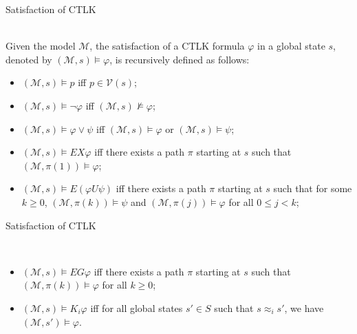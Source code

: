 \documentclass{beamer}
\begin{document}
\begin{frame}{Satisfaction of CTLK}
\begin{definition} ~\\
Given the model $ \mathcal M$, the satisfaction of a CTLK formula
$ \varphi$ in a global state $ s$, denoted by $ (\mathcal M, s )
\models \varphi$, is recursively defined as follows:

\begin{itemize}
\item $ (\mathcal{M}, s ) \models p$ iff $ p \in \mathcal{V}(s)$;
\item $ (\mathcal{M}, s ) \models \neg \varphi$ iff $ (\mathcal{M}, s ) \nvDash \varphi$;
\item $ (\mathcal{M}, s ) \models \varphi \vee \psi$ iff $(\mathcal{M}, s ) \models \varphi$ or $(\mathcal{M}, s ) \models \psi$;
\item $ (\mathcal{M}, s ) \models EX \varphi $ iff there exists a path $\pi$ starting at $s$ such that $ (\mathcal{M}, \pi(1) ) \models \varphi$;
\item $ (\mathcal{M}, s ) \models E ( \varphi U \psi)$ iff there exists a path $\pi$ starting at $s$ such that for some $ k \geq 0$,
$ (\mathcal{M}, \pi(k) ) \models \psi$ and $ (\mathcal{M}, \pi(j) ) \models \varphi$ for all $ 0 \leq j < k$;

\end{itemize}
\label {dfn: Satisfaction of CTLK}
\end{definition}
\end{frame}
\begin{frame}{Satisfaction of CTLK}
\begin{definition} ~\\
\begin{itemize}
\item $ (\mathcal{M}, s ) \models EG \varphi$ iff there exists a path $\pi$  starting at $s$ such that $ (\mathcal{M}, \pi(k) ) \models \varphi$ for all $ k \geq 0$;
\item $ (\mathcal{M}, s ) \models K_i \varphi $ iff for all global states $s' \in S$ such that $s \approx_i s'$, we have $(\mathcal{M}, s' ) \models \varphi $.
\end{itemize}
\label {dfn: Satisfaction of CTLK}
\end{definition}
\end{frame}
\end{document}
